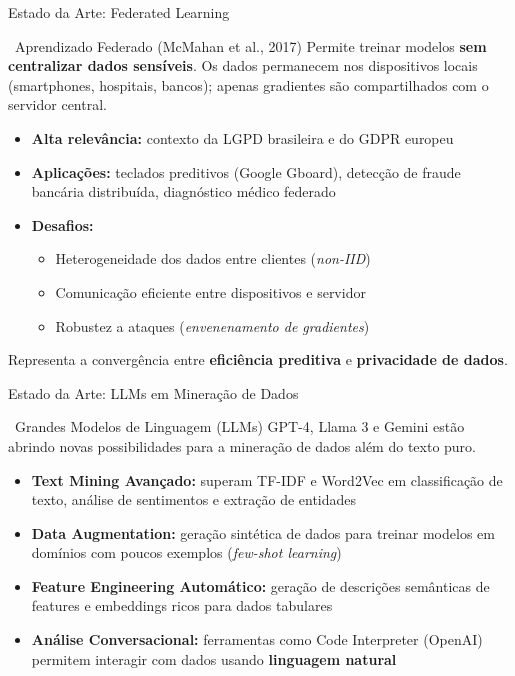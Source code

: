 \documentclass[aspectratio=169]{beamer}
\begin{document}
\begin{frame}{Estado da Arte: Federated Learning}
    \begin{block}{\faLock\ Aprendizado Federado (McMahan et al., 2017)}
        Permite treinar modelos \textbf{sem centralizar dados sensíveis}. Os dados permanecem nos dispositivos locais (smartphones, hospitais, bancos); apenas gradientes são compartilhados com o servidor central.
    \end{block}
    \vspace{0.2cm}
    \begin{itemize}
        \item \textbf{Alta relevância:} contexto da LGPD brasileira e do GDPR europeu
        \item \textbf{Aplicações:} teclados preditivos (Google Gboard), detecção de fraude bancária distribuída, diagnóstico médico federado
        \item \textbf{Desafios:}
            \begin{itemize}
                \item Heterogeneidade dos dados entre clientes (\textit{non-IID})
                \item Comunicação eficiente entre dispositivos e servidor
                \item Robustez a ataques (\textit{envenenamento de gradientes})
            \end{itemize}
    \end{itemize}
    \vspace{0.1cm}
    \begin{alertblock}{}
        \small Representa a convergência entre \textbf{eficiência preditiva} e \textbf{privacidade de dados}.
    \end{alertblock}
\end{frame}

\begin{frame}{Estado da Arte: LLMs em Mineração de Dados}
    \begin{block}{\faCommentsO\ Grandes Modelos de Linguagem (LLMs)}
        GPT-4, Llama 3 e Gemini estão abrindo novas possibilidades para a mineração de dados além do texto puro.
    \end{block}
    \vspace{0.2cm}
    \begin{itemize}
        \item \textbf{Text Mining Avançado:} superam TF-IDF e Word2Vec em classificação de texto, análise de sentimentos e extração de entidades
        \item \textbf{Data Augmentation:} geração sintética de dados para treinar modelos em domínios com poucos exemplos (\textit{few-shot learning})
        \item \textbf{Feature Engineering Automático:} geração de descrições semânticas de features e embeddings ricos para dados tabulares
        \item \textbf{Análise Conversacional:} ferramentas como Code Interpreter (OpenAI) permitem interagir com dados usando \textbf{linguagem natural}
    \end{itemize}
\end{frame}
\end{document}
